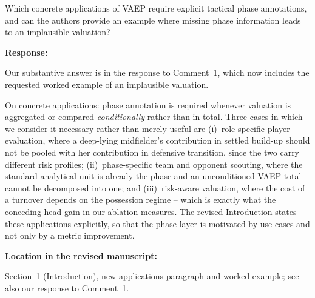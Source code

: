 \documentclass[11pt,a4paper]{article}
\newcommand{\pending}[1]{\textcolor{statuspending}{#1}}
\newcommand{\response}[2]{%
  \begin{responsebox}
  \textbf{Response:}

  #1
  \end{responsebox}
  \begin{locationbox}
  \textbf{Location in the revised manuscript:}

  #2
  \end{locationbox}
}
\begin{document}
\begin{reviewbox}[Question 1]
Which concrete applications of VAEP require explicit tactical phase annotations, and can the authors provide an example where missing phase information leads to an implausible valuation?
\end{reviewbox}
\response{\pending{Our substantive answer is in the response to Comment~1, which now includes the requested worked example of an implausible valuation.}

On concrete applications: phase annotation is required whenever valuation is aggregated or compared \emph{conditionally} rather than in total. Three cases in which we consider it necessary rather than merely useful are (i)~role-specific player evaluation, where a deep-lying midfielder's contribution in settled build-up should not be pooled with her contribution in defensive transition, since the two carry different risk profiles; (ii)~phase-specific team and opponent scouting, where the standard analytical unit is already the phase and an unconditioned VAEP total cannot be decomposed into one; and (iii)~risk-aware valuation, where the cost of a turnover depends on the possession regime -- which is exactly what the conceding-head gain in our ablation measures. The revised Introduction states these applications explicitly, so that the phase layer is motivated by use cases and not only by a metric improvement.}{Section~1 (Introduction), new applications paragraph and worked example; see also our response to Comment~1.}
\end{document}
